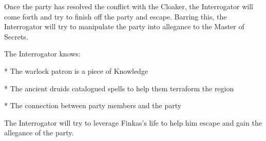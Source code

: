 Once the party has resolved the conflict with the Cloaker, the Interrogator will come forth and try to finish off the party and escape.
Barring this, the Interrogator will try to manipulate the party into allegance to the Master of Secrets.

The Interrogator knows:

* The warlock patron is a piece of Knowledge

* The ancient druids catalogued spells to help them terraform the region

* The connection between party members and the party

The Interrogator will try to leverage Finkas's life to help him escape and gain the allegance of the party.

